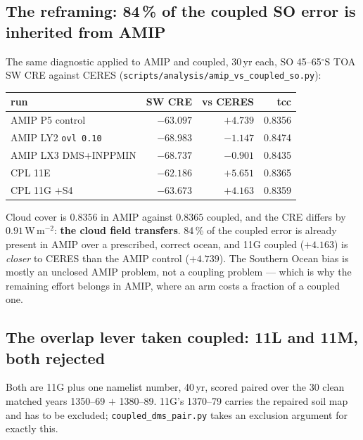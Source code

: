\documentclass[10pt]{article}
\begin{document}
\subsection{The reframing: 84\,\% of the coupled SO error is inherited from AMIP}\label{sub:r30inherit}

The same diagnostic applied to AMIP and coupled, 30\,yr each, SO 45--65$^\circ$S TOA SW
CRE against CERES (\texttt{scripts/analysis/amip\_vs\_coupled\_so.py}):

\begin{center}\small
\begin{tabular}{lrrr}
\toprule
run & SW CRE & vs CERES & tcc \\
\midrule
AMIP P5 control            & $-63.097$ & $\mathbf{+4.739}$ & 0.8356 \\
AMIP LY2 \texttt{ovl 0.10} & $-68.983$ & $-1.147$          & 0.8474 \\
AMIP LX3 DMS+INPPMIN       & $-68.737$ & $-0.901$          & 0.8435 \\
CPL 11E                    & $-62.186$ & $\mathbf{+5.651}$ & 0.8365 \\
CPL 11G $+$S4              & $-63.673$ & $\mathbf{+4.163}$ & 0.8359 \\
\bottomrule
\end{tabular}
\end{center}

Cloud cover is $0.8356$ in AMIP against $0.8365$ coupled, and the CRE differs by
$0.91$\,W\,m$^{-2}$: \textbf{the cloud field transfers}. 84\,\% of the coupled error is
already present in AMIP over a prescribed, correct ocean, and 11G coupled ($+4.163$) is
\emph{closer} to CERES than the AMIP control ($+4.739$). The Southern Ocean bias is
mostly an unclosed AMIP problem, not a coupling problem --- which is why the remaining
effort belongs in AMIP, where an arm costs a fraction of a coupled one.

\subsection{The overlap lever taken coupled: 11L and 11M, both rejected}\label{sub:r30lm}

Both are 11G plus one namelist number, 40\,yr, scored paired over the 30 clean matched
years 1350--69 $+$ 1380--89. 11G's 1370--79 carries the repaired soil map and has to be
excluded; \texttt{coupled\_dms\_pair.py} takes an exclusion argument for exactly this.
\end{document}
